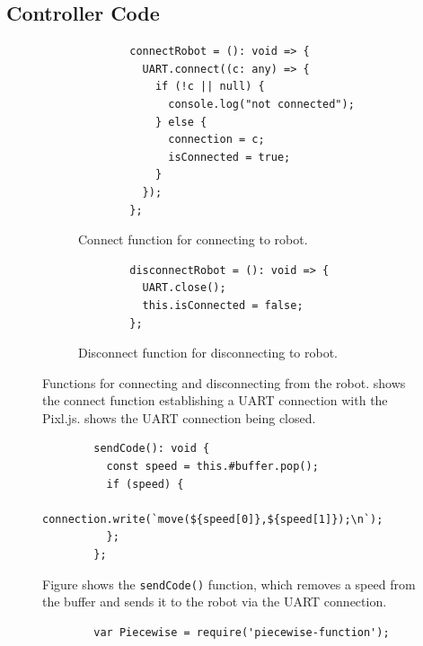 \documentclass{l4proj}
\begin{document}
\begin{appendices}
\chapter{Controller Code}
\begin{figure}[!h]
    \centering
    \begin{subfigure}{0.49\textwidth}
        \begin{lstlisting}
        connectRobot = (): void => {
          UART.connect((c: any) => {
            if (!c || null) {
              console.log("not connected");
            } else {
              connection = c;
              isConnected = true;
            }
          });
        };
        \end{lstlisting}
    \caption{Connect function for connecting to robot.}
    \label{lst:connect-func}
    \end{subfigure}
    \begin{subfigure}{0.49\textwidth}
        \begin{lstlisting}
        disconnectRobot = (): void => {
          UART.close();
          this.isConnected = false;
        };
        \end{lstlisting}
    \caption{Disconnect function for disconnecting to robot.}
    \label{lst:disconnect-func}
    \end{subfigure}
    \caption{Functions for connecting and disconnecting from the robot.  shows the connect function establishing a UART connection with the Pixl.js.  shows the UART connection being closed.}
    \label{lst:connection-funcs}
\end{figure}


\begin{figure}[!h]
    \centering
        \begin{lstlisting}
        sendCode(): void {
          const speed = this.#buffer.pop();
          if (speed) {
            connection.write(`move(${speed[0]},${speed[1]});\n`);
          };
        };
        \end{lstlisting}
    \caption{Figure shows the \lstinline{sendCode()} function, which removes a speed from the buffer and sends it to the robot via the UART connection.}
    \label{lst:send-code}
\end{figure}


\begin{figure}[!h]
    \centering
        \begin{lstlisting}
        var Piecewise = require('piecewise-function');


\end{lstlisting}
\end{figure}
\end{appendices}
\end{document}
